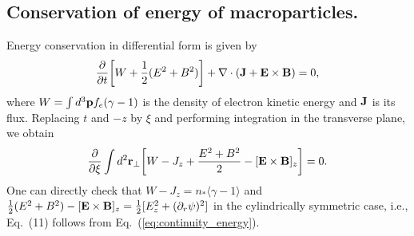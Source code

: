 \documentclass[twocolumn,showpacs,aip]{revtex4}
\begin{document}
\begin{appendix}
\section{Conservation of energy of macroparticles.}
Energy conservation in differential form is given by
\begin{eqnarray}
\frac{\partial}{\partial t}\bigg[W+\frac{1}{2}(E^2+B^2)\bigg]+\nabla\cdot ({\bf{J}}+{\bf{E}}\times {\bf{B}})=0, 
\label{eq:energy_conser_A}
\end{eqnarray}
where  
$W=\int d^3{\bf{p}} f_e(\gamma-1)$ is the  density of electron kinetic energy
 and  ${\bf{J}}$  is its flux. Replacing $t$ and $-z$ by $\xi$
and performing integration in the transverse plane, we obtain
\begin{eqnarray}
\frac{\partial}{\partial\xi}\int d^2{\bf{r}}_{\perp}\bigg[W-J_z+\frac{E^2+B^2}{2}-[{\bf{E}}\times {\bf{B}}]_z\bigg]=0. 
\label{eq:continuity_energy}
\end{eqnarray}
One can directly  check that  $W-J_z=n_*\langle \gamma-1\rangle$ and $\frac{1}{2}(E^2+B^2)-[{\bf{E}}\times {\bf{B}}]_z=\frac{1}{2}[E_z^2+(\partial_r\psi)^2]$ in the cylindrically symmetric case, i.e., Eq.~(11) follows from Eq.~(\ref{eq:continuity_energy}). 
%
%

\end{appendix}
\end{document}

